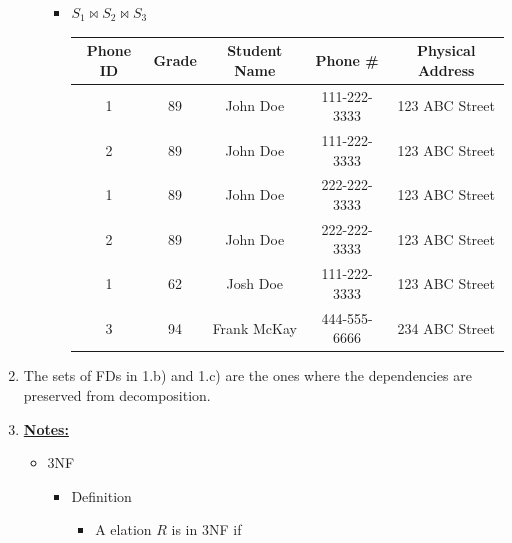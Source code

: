 \documentclass[12pt]{article}
\begin{document}
\begin{enumerate}[1.]
\begin{enumerate}[a)]
\begin{itemize}
            \item $S_1 \bowtie S_2 \bowtie S_3$

            \begin{tabular}{|c|c|c|c|c|}
                \hline
                Phone ID & Grade & Student Name & Phone \# & Physical Address\\
                \hline
                1 & 89 & John Doe & 111-222-3333 & 123 ABC Street\\
                \hline
                2 & 89 & John Doe & 111-222-3333 & 123 ABC Street\\
                \hline
                1 & 89 & John Doe & 222-222-3333 & 123 ABC Street\\
                \hline
                2 & 89 & John Doe & 222-222-3333 & 123 ABC Street\\
                \hline
                1 & 62 & Josh Doe & 111-222-3333 & 123 ABC Street\\
                \hline
                3 & 94 & Frank McKay & 444-555-6666 & 234 ABC Street\\
                \hline
            \end{tabular}

        \end{itemize}


    \end{enumerate}

    \item

    The sets of FDs in 1.b) and 1.c) are the ones where the dependencies are
    preserved from decomposition.

    \item

    \bigskip

    \underline{\textbf{Notes:}}

    \bigskip

    \begin{itemize}
        \item 3NF
        \begin{itemize}
            \item Definition
            \begin{itemize}
                \item A elation $R$ is in 3NF if

                \bigskip


\end{itemize}
\end{itemize}
\end{itemize}
\end{enumerate}
\end{document}

